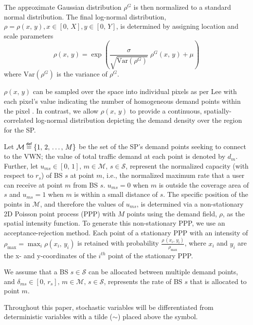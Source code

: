 \documentclass[conference]{IEEEtran}
\newcommand\myeq{\mathrel{\overset{\makebox[0pt]{\mbox{\normalfont\tiny\sffamily def}}}{=}}}
\begin{document}
The approximate Gaussian distribution $\rho^G$ is then normalized to a standard normal distribution.  The final log-normal distribution, $\rho = \rho\left(x,\, y\right), x \in [0,\, X], y \in [0,\, Y]$, is determined by assigning location and scale parameters
\begin{equation}
\rho\left(x,\, y\right) = \exp\left(\frac{\sigma}{\sqrt{\text{Var}\left(\rho^G\right)}} \; \rho^G\left(x,\, y\right)+\mu\right)
\end{equation} \label{eq:rhoLN}
\noindent where $\text{Var}\left(\rho^G\right)$ is the variance of $\rho^G$.

$\rho\left(x,\, y\right)$ can be sampled over the space into individual pixels as per Lee with each pixel's value indicating the number of homogeneous demand points within the pixel \cite{6554749}.  In contrast, we allow $\rho\left(x,\, y\right)$ to provide a continuous, spatially-correlated log-normal distribution depicting the demand density over the region for the SP.

Let $\mathcal{M} \myeq \{1,\, 2,\, \ldots,\, M\}$ be the set of the SP's demand points seeking to connect to the VWN; the value of total traffic demand at each point is denoted by $d_m$.  Further, let $u_{ms} \in [0,\, 1],\, m \in \mathcal{M},\, s \in \mathcal{S}$, represent the normalized capacity (with respect to $r_s$) of BS $s$ at point $m$, i.e., the normalized maximum rate that a user can receive at point $m$ from BS $s$.  $u_{ms} = 0$ when $m$ is outside the coverage area of $s$ and $u_{ms} = 1$ when $m$ is within a small distance of $s$.  The specific position of the points in $\mathcal{M}$, and therefore the values of $u_{ms}$, is determined via a non-stationary 2D Poisson point process (PPP) with $M$ points using the demand field, $\rho$, as the spatial intensity function.  To generate this non-stationary PPP, we use an acceptance-rejection method.  Each point of a stationary PPP with an intensity of $\rho_{\max} = \max_i\rho\left(x_i,\, y_i\right)$ is retained with probability $\frac{\rho\,\left(x_i,\, y_i\right)}{\rho_{\max}}$, where $x_i$ and $y_i$ are the x- and y-coordinates of the $i^{th}$ point of the stationary PPP.

We assume that a BS $s \in \mathcal{S}$ can be allocated between multiple demand points, and $\delta_{ms} \in [0,\, r_s],\, m \in \mathcal{M},\, s \in \mathcal{S}$, represents the rate of BS $s$ that is allocated to point $m$.

Throughout this paper, stochastic variables will be differentiated from deterministic variables with a tilde ($\sim$) placed above the symbol.
\end{document}

